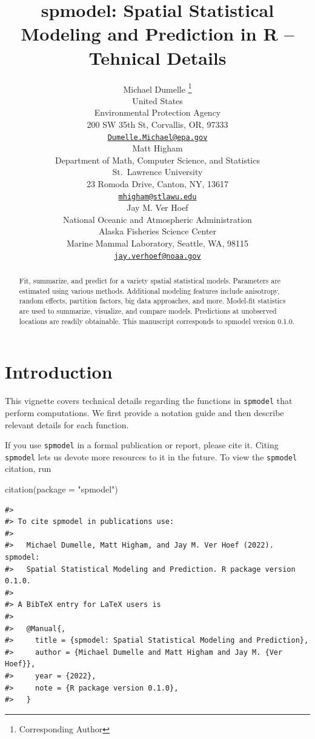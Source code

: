 \documentclass{article}
\title{spmodel: Spatial Statistical Modeling and Prediction in
\textbf{R} -- Tehnical Details}
\author{
    Michael Dumelle
    \thanks{Corresponding Author}
   \\
    United States \\
    Environmental Protection Agency \\
  200 SW 35th St, Corvallis, OR, 97333 \\
  \texttt{\href{mailto:Dumelle.Michael@epa.gov}{\nolinkurl{Dumelle.Michael@epa.gov}}} \\
   \And
    Matt Higham
   \\
    Department of Math, Computer Science, and Statistics \\
    St.~Lawrence University \\
  23 Romoda Drive, Canton, NY, 13617 \\
  \texttt{\href{mailto:mhigham@stlawu.edu}{\nolinkurl{mhigham@stlawu.edu}}} \\
   \And
    Jay M. Ver Hoef
   \\
    National Oceanic and Atmospheric Administration \\
    Alaska Fisheries Science Center \\
  Marine Mammal Laboratory, Seattle, WA, 98115 \\
  \texttt{\href{mailto:jay.verhoef@noaa.gov}{\nolinkurl{jay.verhoef@noaa.gov}}} \\
  }
\newenvironment{Shaded}{\begin{snugshade}}{\end{snugshade}}
\newcommand{\AttributeTok}[1]{\textcolor[rgb]{0.77,0.63,0.00}{#1}}
\newcommand{\FunctionTok}[1]{\textcolor[rgb]{0.00,0.00,0.00}{#1}}
\newcommand{\NormalTok}[1]{#1}
\newcommand{\StringTok}[1]{\textcolor[rgb]{0.31,0.60,0.02}{#1}}
\begin{document}
\maketitle


\begin{abstract}
Fit, summarize, and predict for a variety spatial statistical models.
Parameters are estimated using various methods. Additional modeling
features include anisotropy, random effects, partition factors, big data
approaches, and more. Model-fit statistics are used to summarize,
visualize, and compare models. Predictions at unobserved locations are
readily obtainable. This manuscript corresponds to spmodel version
0.1.0.
\end{abstract}


\hypertarget{introduction}{%
\section{Introduction}\label{introduction}}

This vignette covers technical details regarding the functions in
\texttt{spmodel} that perform computations. We first provide a notation
guide and then describe relevant details for each function.

If you use \texttt{spmodel} in a formal publication or report, please
cite it. Citing \texttt{spmodel} lets us devote more resources to it in
the future. To view the \texttt{spmodel} citation, run

\begin{Shaded}
\begin{Highlighting}[]
\FunctionTok{citation}\NormalTok{(}\AttributeTok{package =} \StringTok{"spmodel"}\NormalTok{)}
\end{Highlighting}
\end{Shaded}

\begin{verbatim}
#> 
#> To cite spmodel in publications use:
#> 
#>   Michael Dumelle, Matt Higham, and Jay M. Ver Hoef (2022). spmodel:
#>   Spatial Statistical Modeling and Prediction. R package version 0.1.0.
#> 
#> A BibTeX entry for LaTeX users is
#> 
#>   @Manual{,
#>     title = {spmodel: Spatial Statistical Modeling and Prediction},
#>     author = {Michael Dumelle and Matt Higham and Jay M. {Ver Hoef}},
#>     year = {2022},
#>     note = {R package version 0.1.0},
#>   }
\end{verbatim}
\end{document}
